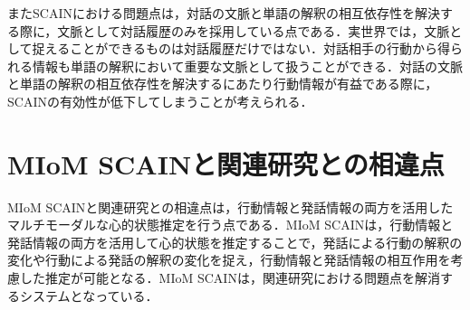 \par
またSCAINにおける問題点は，対話の文脈と単語の解釈の相互依存性を解決する際に，文脈として対話履歴のみを採用している点である．実世界では，文脈として捉えることができるものは対話履歴だけではない．対話相手の行動から得られる情報も単語の解釈において重要な文脈として扱うことができる．対話の文脈と単語の解釈の相互依存性を解決するにあたり行動情報が有益である際に，SCAINの有効性が低下してしまうことが考えられる．

\section{MIoM SCAINと関連研究との相違点}
\par
MIoM SCAINと関連研究との相違点は，行動情報と発話情報の両方を活用したマルチモーダルな心的状態推定を行う点である．MIoM SCAINは，行動情報と発話情報の両方を活用して心的状態を推定することで，発話による行動の解釈の変化や行動による発話の解釈の変化を捉え，行動情報と発話情報の相互作用を考慮した推定が可能となる．MIoM SCAINは，関連研究における問題点を解消するシステムとなっている．
